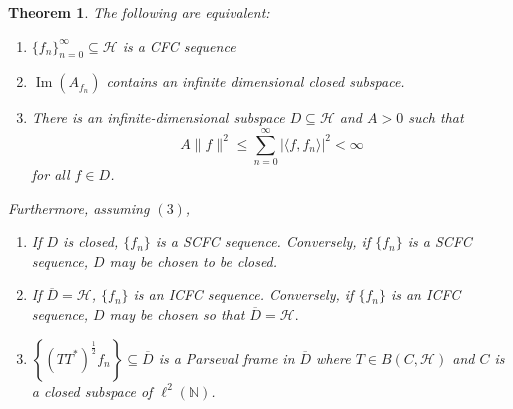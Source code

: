 \documentclass[11pt]{amsart}
\newtheorem{thm}{Theorem}[section]
\theoremstyle{definition}
\numberwithin{equation}{section}
\newcommand{\Hcal}{\mathcal{H}} %
\begin{document}
\begin{thm}\label{mainclassthm}
The following are equivalent:
\begin{enumerate}
    \item $\{f_n\}_{n=0}^{\infty}\subseteq \Hcal$ is a CFC sequence
    \item $\operatorname{Im}(A_{f_n})$ contains an infinite dimensional closed subspace.
    \item There is an infinite-dimensional subspace $D\subseteq \Hcal$ and $A>0$ such that
$$A\|f\|^2 \leq \sum_{n=0}^{\infty}|\langle f, f_n\rangle|^{2}<\infty $$
for all $f\in D$.
    
\end{enumerate}

Furthermore, assuming $(3)$,
\begin{enumerate}
    \item If $D$ is closed, $\{f_n\}$ is a SCFC sequence. Conversely, if $\{f_n\}$ is a SCFC sequence, $D$ may be chosen to be closed.
    \item If $\overline{D}=\Hcal$, $\{f_n\}$ is an ICFC sequence. Conversely, if $\{f_n\}$ is an ICFC sequence, $D$ may be chosen so that $\overline{D}=\mathcal{H}.$
    \item 
   $\left\{(TT^{*})^{\frac{1}{2}}f_n  \right\}\subseteq \overline{D}$ is a Parseval frame in $\overline{D}$ where $T\in B(C, \Hcal)$ and $C$ is a closed subspace of $\ell^{2}(\mathbb{N})$.
\end{enumerate}

\end{thm}
\end{document}
